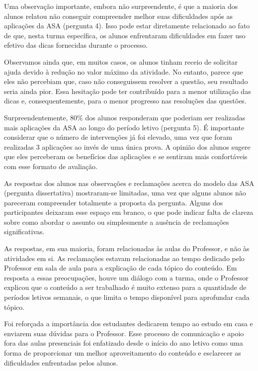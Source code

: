 Uma observação importante, embora não surpreendente, é que a maioria dos alunos relatou não conseguir compreender melhor suas dificuldades após as aplicações da ASA (pergunta 4). Isso pode estar diretamente relacionado ao fato de que, nesta turma específica, os alunos enfrentaram dificuldades em fazer uso efetivo das dicas fornecidas durante o processo.

Observamos ainda que, em muitos casos, os alunos tinham receio de solicitar ajuda devido à redução no valor máximo da atividade. No entanto, parece que eles não percebiam que, caso não conseguissem resolver a questão, seu resultado seria ainda pior. Essa hesitação pode ter contribuído para a menor utilização das dicas e, consequentemente, para o menor progresso nas resoluções das questões.

Surpreendentemente, 80\% dos alunos responderam que poderiam ser realizadas mais aplicações da ASA ao longo do período letivo (pergunta 5). É importante considerar que o número de intervenções já foi elevado, uma vez que foram realizadas 3 aplicações ao invés de uma única prova. A opinião dos alunos sugere que eles perceberam os benefícios das aplicações e se sentiram mais confortáveis com esse formato de avaliação.

As respostas dos alunos nas observações e reclamações acerca do modelo das ASA (pergunta dissertativa) mostraram-se limitadas, uma vez que alguns alunos não pareceram compreender totalmente a proposta da pergunta. Alguns dos participantes deixaram esse espaço em branco, o que pode indicar falta de clareza sobre como abordar o assunto ou simplesmente a ausência de reclamações significativas. 

As respostas, em sua maioria, foram relacionadas às aulas do Professor, e não às atividades em si. As reclamações estavam relacionadas ao tempo dedicado pelo Professor em sala de aula para a explicação de cada tópico do conteúdo. Em resposta a essas preocupações, houve um diálogo com a turma, onde o Professor explicou que o conteúdo a ser trabalhado é muito extenso para a quantidade de períodos letivos semanais, o que limita o tempo disponível para aprofundar cada tópico.

Foi reforçada a importância dos estudantes dedicarem tempo ao estudo em casa e enviarem suas dúvidas para o Professor. Esse processo de comunicação e apoio fora das aulas presenciais foi enfatizado desde o início do ano letivo como uma forma de proporcionar um melhor aproveitamento do conteúdo e esclarecer as dificuldades enfrentadas pelos alunos. 

